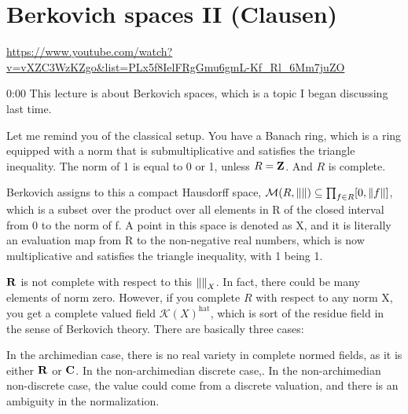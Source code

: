 
\section{\ufs Berkovich spaces II (Clausen)}

\url{https://www.youtube.com/watch?v=vXZC3WzKZgo&list=PLx5f8IelFRgGmu6gmL-Kf_Rl_6Mm7juZO}
\renewcommand{\yt}[2]{\href{https://www.youtube.com/watch?v=vXZC3WzKZgo&list=PLx5f8IelFRgGmu6gmL-Kf_Rl_6Mm7juZO&t=#1}{#2}}
\vspace{1em}

\begin{unfinished}{0:00}
This lecture is about Berkovich spaces, which is a topic I began discussing last time.

Let me remind you of the classical setup. You have a Banach ring, which is a ring equipped with a norm that is submultiplicative and satisfies the triangle inequality. The norm of 1 is equal to 0 or 1, unless $R = \mathbf Z$. And $R$ is complete.


Berkovich assigns to this a compact Hausdorff space, $\mathcal{M}(R, \left \lVert  \right \rVert) \subseteq \prod_{f \in R} [ 0, \left \lVert f \right \rVert ]$, which is a subset over the product over all elements in R of the closed interval from 0 to the norm of f. A point in this space is denoted as X, and it is literally an evaluation map from R to the non-negative real numbers, which is now multiplicative and satisfies the triangle inequality, with 1 being 1.

\begin{remark}
$\R$ is not complete with respect to this $\norm{}_X$. In fact, there could be many elements of norm zero. However, if you complete $R$ with respect to any norm X, you get a complete valued field $\mathcal{K}(X)^{\text{hat}}$, which is sort of the residue field in the sense of Berkovich theory.
There are basically three cases:
\begin{enumerate}
\item archimedian $\iff$ $(\R, \norm{}^{\alpha})$ or $(\C, \norm{}^{\alpha)$, $\alpha \in [0, 1]$
\item non-archimedian but discrete, then you have the trivial norm $\norm{}_0 = \text{trivial norm}$
\item non-archimedian non-discrete, $\norm{}_{normalize}^{\alpha}$
\end{enumerate}
In the archimedian case, there is no real variety in complete normed fields, as it is either $\R$ or $\C$. In the non-archimedian discrete case,. In the non-archimedian non-discrete case, the value could come from a discrete valuation, and there is an ambiguity in the normalization.
\end{remark}


\end{unfinished}
